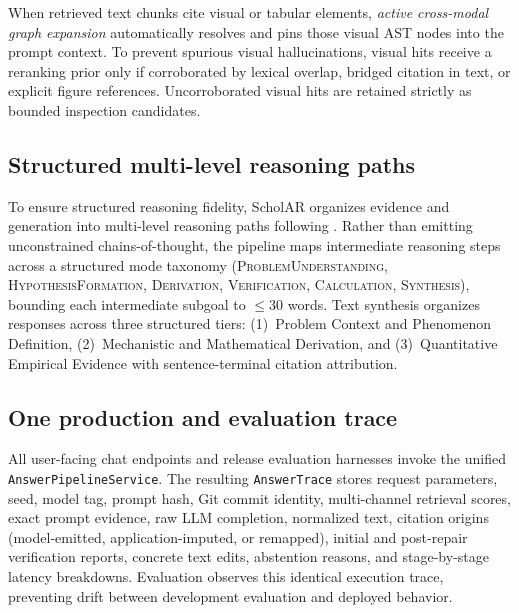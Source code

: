 When retrieved text chunks cite visual or tabular elements, \emph{active cross-modal graph expansion} automatically resolves and pins those visual AST nodes into the prompt context. To prevent spurious visual hallucinations, visual hits receive a reranking prior only if corroborated by lexical overlap, bridged citation in text, or explicit figure references. Uncorroborated visual hits are retained strictly as bounded inspection candidates.

\subsection{Structured multi-level reasoning paths}
To ensure structured reasoning fidelity, ScholAR organizes evidence and generation into multi-level reasoning paths following \citet{sun2025mlr}. Rather than emitting unconstrained chains-of-thought, the pipeline maps intermediate reasoning steps across a structured mode taxonomy (\textsc{ProblemUnderstanding}, \textsc{HypothesisFormation}, \textsc{Derivation}, \textsc{Verification}, \textsc{Calculation}, \textsc{Synthesis}), bounding each intermediate subgoal to $\le 30$ words. Text synthesis organizes responses across three structured tiers: (1)~Problem Context and Phenomenon Definition, (2)~Mechanistic and Mathematical Derivation, and (3)~Quantitative Empirical Evidence with sentence-terminal citation attribution.

\subsection{One production and evaluation trace}
All user-facing chat endpoints and release evaluation harnesses invoke the unified \texttt{AnswerPipeline}\allowbreak\texttt{Service}. The resulting \texttt{AnswerTrace} stores request parameters, seed, model tag, prompt hash, Git commit identity, multi-channel retrieval scores, exact prompt evidence, raw LLM completion, normalized text, citation origins (model-emitted, application-imputed, or remapped), initial and post-repair verification reports, concrete text edits, abstention reasons, and stage-by-stage latency breakdowns. Evaluation observes this identical execution trace, preventing drift between development evaluation and deployed behavior.
